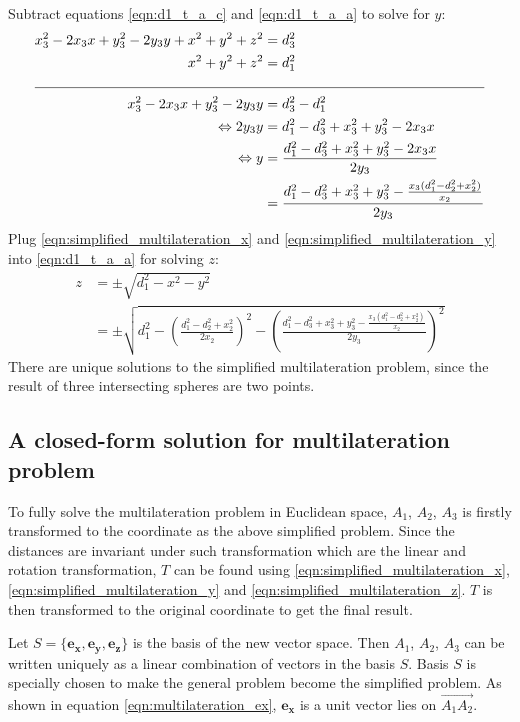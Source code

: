 \documentclass[\main/main.tex]{subfiles}
\begin{document}
Subtract equations \ref{eqn:d1_t_a_c} and \ref{eqn:d1_t_a_a} to solve for $y$:
\begin{equation}
    \begin{split}
        x_3^2  - 2x_3x + y_3^2 - 2y_3y + x^2 + y^2 + z^2 &= d_3^2 \\
        x^2 + y^2 + z^2 &= d_1^2 \\
        \cline{1-2}
        x_3^2  - 2x_3x + y_3^2 - 2y_3y &= d_3^2 - d_1^2\\
        \Leftrightarrow 2y_3y &= d_1^2 - d_3^2 + x_3^2 + y_3^2 - 2x_3x \\
        \Leftrightarrow y &= \frac{d_1^2 - d_3^2 + x_3^2 + y_3^2 - 2x_3x}{2y_3} \\
        &= \frac{d_1^2 - d_3^2 + x_3^2 + y_3^2 - \frac{x_3(d_1^2 - d_2^2 + x_2^2)}{x_2}}{2y_3}
    \end{split}
    \label{eqn:simplified_multilateration_y}
\end{equation}
Plug \ref{eqn:simplified_multilateration_x} and \ref{eqn:simplified_multilateration_y} into \ref{eqn:d1_t_a_a} for solving $z$:
\begin{equation}
    \begin{split}
        z &= \pm \sqrt{d_1^2 - x^2 - y^2} \\
        &= \pm \sqrt{d_1^2 - \left(\frac{d_1^2 - d_2^2 + x_2^2}{2x_2}\right)^2 - \left(\frac{d_1^2 - d_3^2 + x_3^2 + y_3^2 - \frac{x_3(d_1^2 - d_2^2 + x_2^2)}{x_2}}{2y_3}\right)^2}
    \end{split}
    \label{eqn:simplified_multilateration_z}
\end{equation}
There are unique solutions to the simplified multilateration problem, since the result of three intersecting spheres are two points.

\subsection{A closed-form solution for multilateration problem}
To fully solve the multilateration problem in Euclidean space, $A_1$, $A_2$, $A_3$ is firstly transformed to the coordinate as the above simplified problem. Since the distances are invariant under such transformation which are the linear and rotation transformation, $T$ can be found using \ref{eqn:simplified_multilateration_x}, \ref{eqn:simplified_multilateration_y} and \ref{eqn:simplified_multilateration_z}. $T$ is then transformed to the original coordinate to get the final result.

Let $S =\{\boldsymbol{e_x}, \boldsymbol{e_y}, \boldsymbol{e_z}\}$ is the basis of the new vector space. Then $A_1$, $A_2$, $A_3$ can be written uniquely as a linear combination of vectors in the basis $S$. Basis $S$ is specially chosen to make the general problem become the simplified problem. As shown in equation \ref{eqn:multilateration_ex}, $\boldsymbol{e_x}$ is a unit vector lies on $\overrightarrow{A_1A_2}$.
\end{document}
